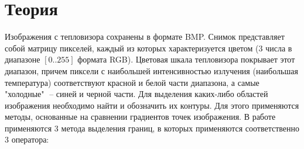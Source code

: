 \section{Теория}

Изображения с тепловизора  сохранены в формате BMP. Снимок представляет собой матрицу пикселей, каждый из которых характеризуется цветом (3 числа в диапазоне $[0..255]$ формата RGB). Цветовая шкала тепловизора покрывает этот диапазон, причем пиксели с наибольшей интенсивностью излучения (наибольшая температура) соответствуют красной и белой части диапазона, а самые "холодные" $\;$-- синей и черной части.
\newline
Для выделения каких-либо областей изображения необходимо найти и обозначить их контуры. Для этого применяются методы, основанные на сравнении градиентов точек изображения.
\newline 
В работе применяются 3 метода выделения границ, в которых применяются соответственно 3 оператора:
